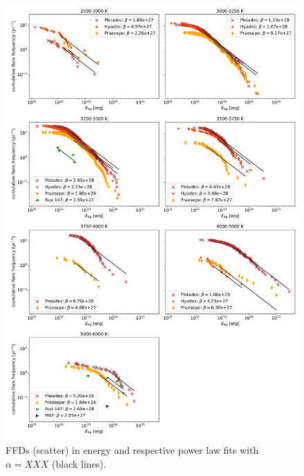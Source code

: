 \documentclass{aa}
\begin{document}
\begin{figure}
    \centering
    \includegraphics[width=16cm]{pics/FFDs/SpT_wise_sample_ffd_energy.png}
    \caption{FFDs (scatter) in energy and respective power law fits with $\alpha=XXX$ (black lines).}          	\label{powerlawfits_s}
\end{figure}

\end{document}
